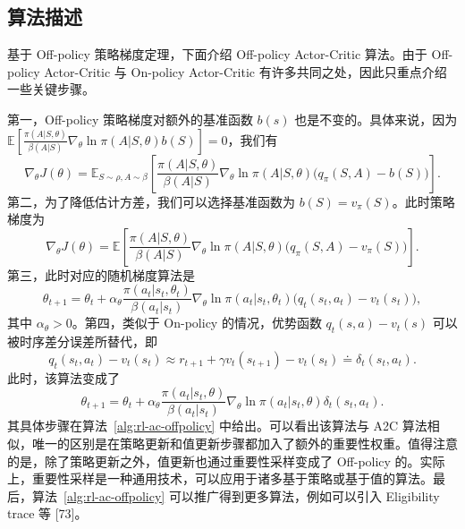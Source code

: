 \subsection{算法描述}
\label{sec:rl-ac-offpolicy-alg}

基于 Off-policy 策略梯度定理，下面介绍 Off-policy Actor-Critic 算法。由于 Off-policy Actor-Critic 与 On-policy Actor-Critic 有许多共同之处，因此只重点介绍一些关键步骤。

第一，Off-policy 策略梯度对额外的基准函数 $b(s)$ 也是不变的。具体来说，因为 $\mathbb{E}\left[\frac{\pi(A | S, \theta)}{\beta(A | S)} \nabla_{\theta} \ln \pi(A | S, \theta) b(S)\right] = 0$，我们有
\[
\nabla_{\theta} J(\theta) = \mathbb{E}_{S \sim \rho, A \sim \beta} \left[ \frac{\pi(A | S, \theta)}{\beta(A | S)} \nabla_{\theta} \ln \pi(A | S, \theta) \big( q_{\pi}(S, A) - b(S) \big) \right].
\]
第二，为了降低估计方差，我们可以选择基准函数为 $b(S) = v_{\pi}(S)$。此时策略梯度为
\[
\nabla_{\theta} J(\theta) = \mathbb{E} \left[ \frac{\pi(A | S, \theta)}{\beta(A | S)} \nabla_{\theta} \ln \pi(A | S, \theta) \big( q_{\pi}(S, A) - v_{\pi}(S) \big) \right].
\]
第三，此时对应的随机梯度算法是
\[
\theta_{t+1} = \theta_{t} + \alpha_{\theta} \frac{\pi(a_{t} | s_{t}, \theta_{t})}{\beta(a_{t} | s_{t})} \nabla_{\theta} \ln \pi(a_{t} | s_{t}, \theta_{t}) \big( q_{t}(s_{t}, a_{t}) - v_{t}(s_{t}) \big),
\]
其中 $\alpha_{\theta} > 0$。第四，类似于 On-policy 的情况，优势函数 $q_{t}(s, a) - v_{t}(s)$ 可以被时序差分误差所替代，即
\[
q_{t}(s_{t}, a_{t}) - v_{t}(s_{t}) \approx r_{t+1} + \gamma v_{t}(s_{t+1}) - v_{t}(s_{t}) \doteq \delta_{t}(s_{t}, a_{t}).
\]
此时，该算法变成了
\[
\theta_{t+1} = \theta_{t} + \alpha_{\theta} \frac{\pi(a_{t} | s_{t}, \theta)}{\beta(a_{t} | s_{t})} \nabla_{\theta} \ln \pi(a_{t} | s_{t}, \theta) \delta_{t}(s_{t}, a_{t}).
\]
其具体步骤在算法~\ref{alg:rl-ac-offpolicy} 中给出。可以看出该算法与 A2C 算法相似，唯一的区别是在策略更新和值更新步骤都加入了额外的重要性权重。值得注意的是，除了策略更新之外，值更新也通过重要性采样变成了 Off-policy 的。实际上，重要性采样是一种通用技术，可以应用于诸多基于策略或基于值的算法。最后，算法~\ref{alg:rl-ac-offpolicy} 可以推广得到更多算法，例如可以引入 Eligibility trace 等 [73]。

